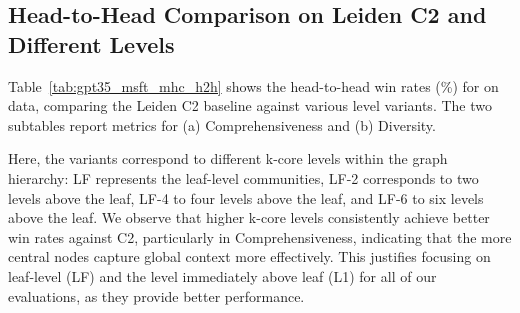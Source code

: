 

\subsection{Head-to-Head Comparison on Leiden C2 and Different \MHC Levels}

Table~\ref{tab:gpt35_msft_mhc_h2h} shows the head-to-head win rates (\%) for \threepointfive on \ms data, comparing the Leiden C2 baseline against various \MHC level variants. The two subtables report metrics for (a) Comprehensiveness and (b) Diversity.  

Here, the \MHC variants correspond to different k-core levels within the graph hierarchy: LF represents the leaf-level communities, LF-2 corresponds to two levels above the leaf, LF-4 to four levels above the leaf, and LF-6 to six levels above the leaf. We observe that higher k-core levels consistently achieve better win rates against C2, particularly in Comprehensiveness, indicating that the more central nodes capture global context more effectively. 
This justifies focusing on leaf-level (LF) and the level immediately above leaf (L1) for all of our evaluations, as they provide better performance.

